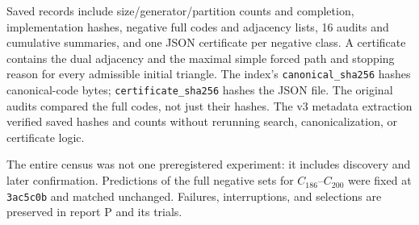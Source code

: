 \documentclass[11pt]{amsart}
\newcommand{\record}[1]{\nolinkurl{#1}}
\begin{document}
Saved records include size/generator/partition counts and completion,
implementation hashes, negative full codes and adjacency lists, 16
audits and cumulative summaries, and one JSON certificate per negative
class. A certificate contains the dual adjacency and the maximal
simple forced path and stopping reason for every admissible initial
triangle. The index's \record{canonical_sha256} hashes canonical-code
bytes; \record{certificate_sha256} hashes the JSON file. The original
audits compared the full codes, not just their hashes. The v3 metadata
extraction verified saved hashes and counts without rerunning search,
canonicalization, or certificate logic.

The entire census was not one preregistered experiment: it includes
discovery and later confirmation. Predictions of the full negative
sets for $C_{186}$--$C_{200}$ were fixed at \record{3ac5c0b} and matched
unchanged. Failures, interruptions, and selections are preserved in
report P and its trials.
\end{document}
